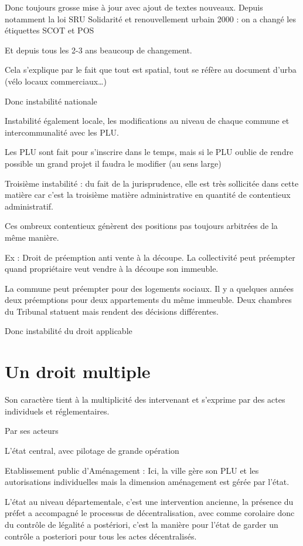 		Donc toujours grosse mise à jour avec ajout de textes nouveaux. Depuis notamment la loi SRU Solidarité et renouvellement urbain 2000 : on a changé les étiquettes SCOT et POS

		Et depuis tous les 2-3 ans beaucoup de changement.

		Cela s’explique par le fait que tout est spatial, tout se réfère au document d’urba (vélo locaux commerciaux…)

		Donc instabilité nationale

		Instabilité également locale, les modifications au niveau de chaque commune et intercommunalité avec les PLU.

		Les PLU sont fait pour s’inscrire dans le temps, mais si le PLU oublie de rendre possible un grand projet il faudra le modifier (au sens large)

		Troisième instabilité : du fait de la jurisprudence, elle est très sollicitée dans cette matière car c’est la troisième matière administrative en quantité de contentieux administratif.

		Ces ombreux contentieux génèrent des positions pas toujours arbitrées de la même manière.

		Ex : Droit de préemption anti vente à la découpe. La collectivité peut préempter quand propriétaire veut vendre à la découpe son immeuble.

		La commune peut préempter pour des logements sociaux. Il y a quelques années deux préemptions pour deux appartements du même immeuble. Deux chambres du Tribunal statuent mais rendent des décisions différentes.

		Donc instabilité du droit applicable

		
	
	\section{Un droit multiple}
	
		Son caractère tient à la multiplicité des intervenant et s'exprime par des actes individuels et réglementaires.
		
		Par ses acteurs

		L’état central, avec pilotage de grande opération

		Etablissement public d’Aménagement : Ici, la ville gère son PLU et les autorisations individuelles mais la dimension aménagement est gérée par l’état.

		L’état au niveau départementale, c’est une intervention ancienne, la présence du préfet a accompagné le processus de décentralisation, avec comme corolaire donc du contrôle de légalité a postériori, c’est la manière pour l’état de garder un contrôle a posteriori pour tous les actes décentralisés.

